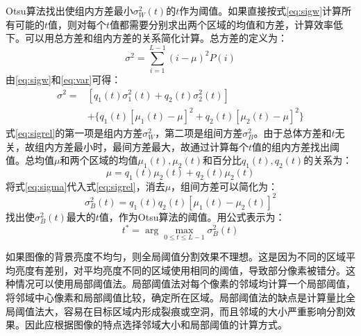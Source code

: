 Otsu算法找出使组内方差最小$\sigma_W^2(t)$的$t$作为阈值。如果直接按式\ref{eq:sigw}计算所有可能的$t$值，则对每个$t$值都需要分别求出两个区域的均值和方差，计算效率低下。可以用总方差和组内方差的关系简化计算。总方差的定义为：
\begin{equation}
  \label{eq:var}
  \sigma^2=\sum_{i=1}^{L-1}(i-\mu)^2P(i)
\end{equation}
由\eqref{eq:sigw}和\eqref{eq:var}可得：
\begin{equation}\begin{split}
  \label{eq:sigrel}
  \sigma^2 =&[q_1(t)\sigma_1^2(t)+q_2(t)\sigma_2^2(t)] \\
  &  +\{q_1(t)[\mu_1(t)-\mu]^2+q_2(t)[\mu_2(t)-\mu]^2\}
\end{split}\end{equation}
式\eqref{eq:sigrel}的第一项是组内方差$\sigma_W^2$，第二项是组间方差$\sigma_B^2$。由于总体方差和$t$无关，故组内方差最小时，最间方差最大，故通过计算每个$t$值的组内方差找出阈值。总均值$\mu$和两个区域的均值$\mu_1(t),\mu_2(t)$和百分比$q_1(t),q_2(t)$的关系为：
\begin{equation}
  \label{eq:sigma}
  \mu=q_1(t)\mu_2(t)+q_2(t)\mu_2(t)
\end{equation}
将式\eqref{eq:sigma}代入式\eqref{eq:sigrel}，消去$\mu$，组间方差可以简化为：
\begin{equation}
  \label{eq:sigb}
  \sigma_B^2(t)=q_1(t)q_2(t)[\mu_1(t)-\mu_2(t)]^2
\end{equation}
找出使$\sigma_B^2(t)$最大的$t$值，作为Otsu算法的阈值。用公式表示为：
\begin{equation}
  \label{eq:otsu}
  t^{*}=\arg\max_{0\leqslant t\leqslant L-1}\sigma_B^2(t)
\end{equation}

如果图像的背景亮度不均匀，则全局阈值分割效果不理想。这是因为不同的区域平均亮度有差别，对平均亮度不同的区域使用相同的阈值，导致部分像素被错分。这种情况可以使用局部阈值法。局部阈值法对每个像素的邻域均计算一个局部阈值，将邻域中心像素和局部阈值比较，确定所在区域。局部阈值法的缺点是计算量比全局阈值法大，容易在目标区域内形成裂痕或空洞，而且邻域的大小严重影响分割效果。因此应根据图像的特点选择邻域大小和局部阈值的计算方式。



